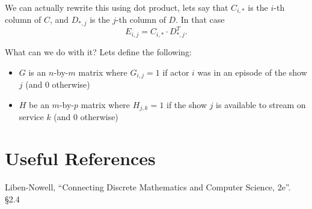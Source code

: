 \documentclass[11pt, oneside]{article}   	%
\begin{document}
We can actually rewrite this using dot product, lets say that $C_{i,*}$ is the $i$-th column of $C$, and $D_{*,j}$ is the $j$-th column of $D$.
In that case \[E_{i,j} = C_{i,*}\cdot D_{*,j}^T.\]

What can we do with it? Lets define the following:
\begin{itemize}
\item $G$ is an $n$-by-$m$ matrix where $G_{i,j}=1$ if actor $i$ was in an episode of the show $j$ (and $0$ otherwise)
\item $H$ be an $m$-by-$p$ matrix where $H_{j,k}=1$ if the show $j$ is available to stream on service $k$ (and $0$ otherwise) 
\end{itemize}


\section*{Useful References}
Liben-Nowell, ``Connecting Discrete Mathematics and Computer Science, 2e''. \S 2.4
\end{document}
